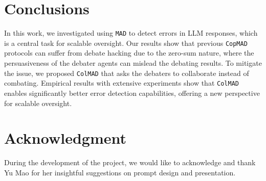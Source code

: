 \documentclass{article} %
\newcommand{\ours}[0]{\texttt{ColMAD}\xspace}
\newcommand{\copmad}[0]{\texttt{CopMAD}\xspace}
\newcommand{\mad}[0]{\texttt{MAD}\xspace}
\begin{document}
% 



\section{Conclusions}
In this work, we investigated using \mad to detect errors in LLM responses, which is a central task for scalable oversight. Our results show that previous \copmad protocols can suffer from debate hacking due to the zero-sum nature, where the persuasiveness of the debater agents can mislead the debating results. To mitigate the issue, we proposed \ours that asks the debaters to collaborate instead of combating. Empirical results with extensive experiments show that \ours enables significantly better error detection capabilities, offering a new perspective for scalable oversight.

\section*{Acknowledgment}
During the development of the project, we would like to acknowledge and thank Yu Mao for her insightful suggestions on prompt design and presentation. 
\end{document}
